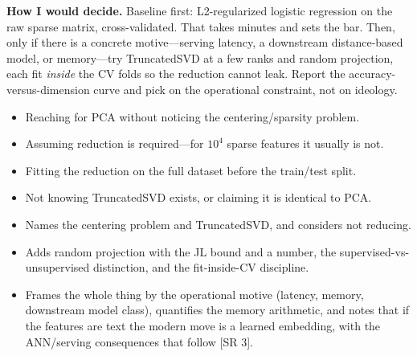 \begin{interviewq}
\textbf{How I would decide.} Baseline first: L2-regularized logistic regression on the raw sparse matrix, cross-validated. That takes minutes and sets the bar. Then, only if there is a concrete motive---serving latency, a downstream distance-based model, or memory---try TruncatedSVD at a few ranks and random projection, each fit \emph{inside} the CV folds so the reduction cannot leak. Report the accuracy-versus-dimension curve and pick on the operational constraint, not on ideology.

\redflags
\begin{itemize}
    \item Reaching for PCA without noticing the centering/sparsity problem.
    \item Assuming reduction is required---for $10^4$ sparse features it usually is not.
    \item Fitting the reduction on the full dataset before the train/test split.
    \item Not knowing TruncatedSVD exists, or claiming it is identical to PCA.
\end{itemize}


\goodgreat
\begin{itemize}
    \item {} Names the centering problem and TruncatedSVD, and considers not reducing.
    \item {} Adds random projection with the JL bound and a number, the supervised-vs-unsupervised distinction, and the fit-inside-CV discipline.
    \item {} Frames the whole thing by the operational motive (latency, memory, downstream model class), quantifies the memory arithmetic, and notes that if the features are text the modern move is a learned embedding, with the ANN/serving consequences that follow [SR 3].
\end{itemize}

\end{interviewq}

